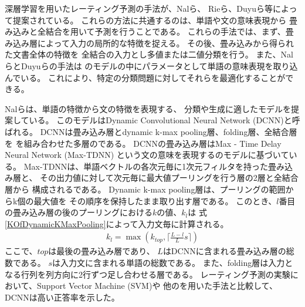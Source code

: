 深層学習を用いたレーティング予測の手法が、Nalら\cite{nal14}、
Rieら\cite{rie14}、Duyuら\cite{duyu15}等によって提案されている。
これらの方法に共通するのは、単語や文の意味表現から
畳み込み\nn と全結合\nn を用いて予測を行うことである。
これらの手法では、まず、畳み込み層によって入力の局所的な特徴を捉える。
その後、畳み込み\nn から得られた文書全体の特徴を
全結合\nn の入力とし多値または二値分類を行う。
また、Nalら\cite{nal14}とDuyuら\cite{duyu15}の手法は
\nn のモデルの中にパラメータとして単語の意味表現を取り込んでいる。
これにより、特定の分類問題に対してそれらを最適化することができる。

Nalら\cite{nal14}は、単語の特徴から文の特徴を表現する、
分類や生成に適したモデルを提案している。
このモデルはDynamic Convolutional Neural Network (DCNN)と呼ばれる。
DCNNは畳み込み層とdynamic k-max pooling層、folding層、全結合層を
を組み合わせた多層の\nn である。
DCNNの畳み込み層はMax - Time Delay Neural Network (Max-TDNN)\cite{ronan08}
という文の意味を表現する\nn のモデルに基づいている。
Max-TDNNは、単語ベクトルの各次元毎に1次元フィルタを持った畳み込み層と、
その出力値に対して次元毎に最大値プーリングを行う層の2層と全結合層から
構成される\nn である。
Dynamic k-max pooling層は、プーリングの範囲からk個の最大値を
その順序を保持したまま取り出す層である。
このとき、$l$番目の畳み込み層の後のプーリングにおける$k$の値、$k_l$は
式\ref{KOfDynamicKMaxPooling}によって入力文毎に計算される。
\begin{gather} \label{KOfDynamicKMaxPooling}
  k_l = \max \left( k_{top}, \lceil \frac{L - l}{L}s \rceil \right)
\end{gather}
ここで、$top$は最後の畳み込み層であり、
$L$はDCNNに含まれる畳み込み層の総数である。
$s$は入力文に含まれる単語の総数である。
また、folding層は入力となる行列を列方向に2行ずつ足し合わせる層である。
レーティング予測の実験において、Support Vector Machine (SVM)や
他の\nn を用いた手法と比較して、DCNNは高い正答率を示した。

